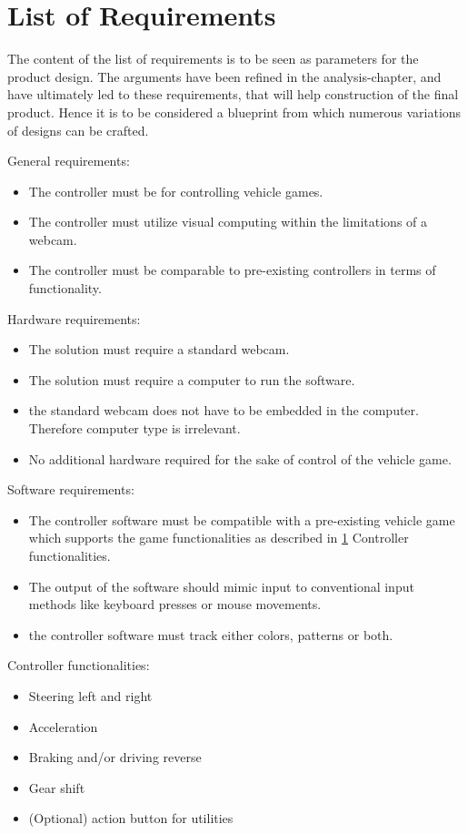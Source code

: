 \section{List of Requirements}
\label{LOR}

The content of the list of requirements is to be seen as parameters for the product design. The arguments have been refined in the analysis-chapter, and have ultimately led to these requirements, that will help construction of the final product. Hence it is to be considered a blueprint from which numerous variations of designs can be crafted.
\bigskip

\noindent General requirements:
\begin{itemize}
\item The controller must be for controlling vehicle games.
\item The controller must utilize visual computing within the limitations of a webcam.
\item The controller must be comparable to pre-existing controllers in terms of functionality.
\end{itemize}
Hardware requirements:
\begin{itemize}
\item The solution must require a standard webcam.
\item The solution must require a computer to run the software.
\item the standard webcam does not have to be embedded in the computer. Therefore computer type is irrelevant.
\item No additional hardware required for the sake of control of the vehicle game.
\end{itemize}
Software requirements:
\begin{itemize}
\item The controller software must be compatible with a pre-existing vehicle game which supports the game functionalities as described in \ref{LOR} Controller functionalities. 
\item The output of the software should mimic input to conventional input methods like keyboard presses or mouse movements.
\item the controller software must track either colors, patterns or both.
\end{itemize}
Controller functionalities:
\begin{itemize}
\item Steering left and right
\item Acceleration
\item Braking and/or driving reverse
\item Gear shift
\item (Optional) action button for utilities 
\end{itemize}